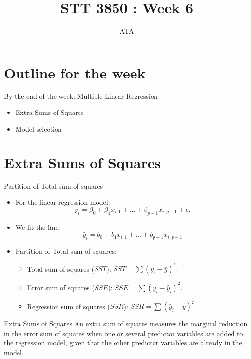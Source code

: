 \documentclass[
  ignorenonframetext,
]{beamer}
\title{STT 3850 : Week 6}
\author{ATA}
\date{}
\institute{Appalachian State University}
\providecommand{\tightlist}{%
  \setlength{\itemsep}{0pt}\setlength{\parskip}{0pt}}
\begin{document}
\frame{\titlepage}

\section{Outline for the week}\label{outline-for-the-week}

\begin{frame}{By the end of the week: Multiple Linear Regression}
\label{by-the-end-of-the-week-multiple-linear-regression}
\begin{itemize}
\tightlist
\item
  Extra Sums of Squares
\item
  Model selection
\end{itemize}
\end{frame}

\section{Extra Sums of Squares}\label{extra-sums-of-squares}

\begin{frame}{Partition of Total sum of squares}
\label{partition-of-total-sum-of-squares}
\begin{itemize}
\item
  For the linear regression model:
  \[y_i=\beta_0+\beta_1x_{i,1}+\ldots + \beta_{p-1}x_{i,p-1}+\epsilon_i\]
\item
  We fit the line:
  \[\hat{y}_i=b_0+b_1x_{i,1}+\ldots + b_{p-1}x_{i,p-1}\]
\item
  Partition of Total sum of squares:

  \begin{itemize}
  \item
    Total sum of squares (\(SST\)): \(SST=\sum(y_i-\bar{y})^2.\)
  \item
    Error sum of squares (\(SSE\)): \(SSE=\sum (y_i-\hat{y}_i)^2.\)
  \item
    Regression sum of squares (\(SSR\)):
    \(SSR=\sum (\hat{y}_i-\bar{y})^2\)
  \end{itemize}
\end{itemize}
\end{frame}

\begin{frame}{Extra Sums of Squares}
\label{extra-sums-of-squares-1}
An extra sum of squares measures the marginal reduction in the error sum
of squares when one or several predictor variables are added to the
regression model, given that the other predictor variables are already
in the model.
\end{frame}
\end{document}
